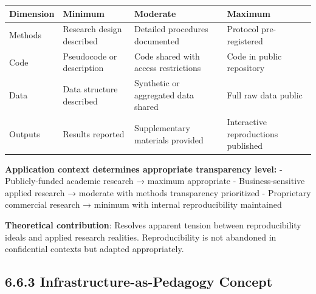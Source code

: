 \documentclass[
  oneside,
  open=any]{scrbook}
\begin{document}
\begin{longtable}[]{@{}
  >{\raggedright\arraybackslash}p{}
  >{\raggedright\arraybackslash}p{}
  >{\raggedright\arraybackslash}p{}
  >{\raggedright\arraybackslash}p{}@{}}
\toprule\noalign{}
\begin{minipage}[b]{\linewidth}\raggedright
Dimension
\end{minipage} & \begin{minipage}[b]{\linewidth}\raggedright
Minimum
\end{minipage} & \begin{minipage}[b]{\linewidth}\raggedright
Moderate
\end{minipage} & \begin{minipage}[b]{\linewidth}\raggedright
Maximum
\end{minipage} \\
\midrule\noalign{}
\endhead
\bottomrule\noalign{}
\endlastfoot
Methods & Research design described & Detailed procedures documented &
Protocol pre-registered \\
Code & Pseudocode or description & Code shared with access restrictions
& Code in public repository \\
Data & Data structure described & Synthetic or aggregated data shared &
Full raw data public \\
Outputs & Results reported & Supplementary materials provided &
Interactive reproductions published \\
\end{longtable}

\textbf{Application context determines appropriate transparency level:}
- Publicly-funded academic research → maximum appropriate -
Business-sensitive applied research → moderate with methods transparency
prioritized - Proprietary commercial research → minimum with internal
reproducibility maintained

\textbf{Theoretical contribution}: Resolves apparent tension between
reproducibility ideals and applied research realities. Reproducibility
is not abandoned in confidential contexts but adapted appropriately.

\subsection{6.6.3 Infrastructure-as-Pedagogy
Concept}\label{infrastructure-as-pedagogy-concept}
\end{document}
